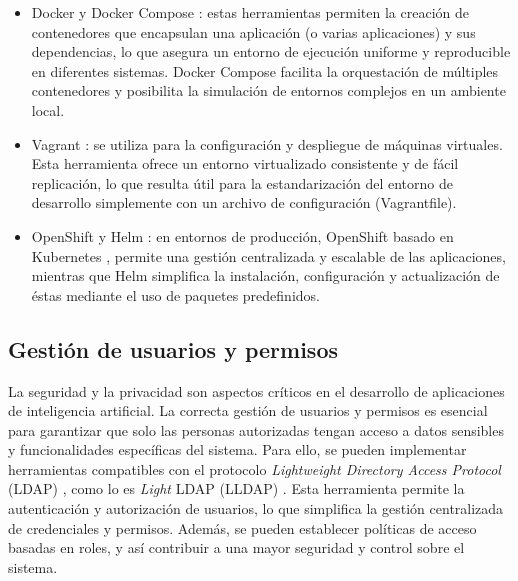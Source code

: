 \begin{itemize}
	\item Docker y Docker Compose \citep{merkel_docker_2014} \citep{docker_docker_0000}: estas herramientas permiten la creación de contenedores que encapsulan una aplicación (o varias aplicaciones) y sus dependencias, lo que asegura un entorno de ejecución uniforme y reproducible en diferentes sistemas. Docker Compose facilita la orquestación de múltiples contenedores y posibilita la simulación de entornos complejos en un ambiente local.
	\item Vagrant \citep{hashicorp_vagrant_2023} \citep{hashicorp_documentation_nodate}: se utiliza para la configuración y despliegue de máquinas virtuales. Esta herramienta ofrece un entorno virtualizado consistente y de fácil replicación, lo que resulta útil para la estandarización del entorno de desarrollo simplemente con un archivo de configuración (Vagrantfile).
	\item OpenShift \citep{red_hat_openshift_2023} \citep{red_hat_red_nodate} y Helm \citep{the_helm_authors_helm_2023} \citep{the_helm_authors_docs_nodate}: en entornos de producción, OpenShift basado en Kubernetes \citep{wikipedia_kubernetes_2025}, permite una gestión centralizada y escalable de las aplicaciones, mientras que Helm simplifica la instalación, configuración y actualización de éstas mediante el uso de paquetes predefinidos.
\end{itemize}

\subsection{Gestión de usuarios y permisos}

La seguridad y la privacidad son aspectos críticos en el desarrollo de aplicaciones de inteligencia artificial. La correcta gestión de usuarios y permisos es esencial para garantizar que solo las personas autorizadas tengan acceso a datos sensibles y funcionalidades específicas del sistema. Para ello, se pueden implementar herramientas compatibles con el protocolo \textit{Lightweight Directory Access Protocol} (LDAP) \citep{noauthor_protocolo_2024}, como lo es \textit{Light} LDAP (LLDAP) \citep{lldap_authors_lldap_2023}. Esta herramienta permite la autenticación y autorización de usuarios, lo que simplifica la gestión centralizada de credenciales y permisos. Además, se pueden establecer políticas de acceso basadas en roles, y así contribuir a una mayor seguridad y control sobre el sistema.

